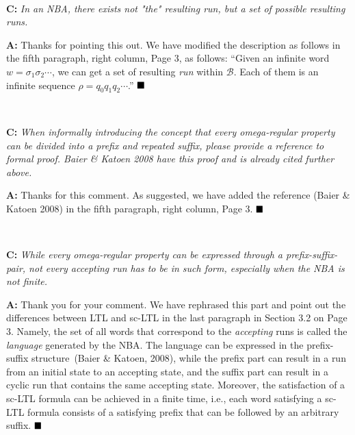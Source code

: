 \documentclass[10pt]{article}
\begin{document}
\hspace*{\fill} \


\textbf{C:}
\emph{In an NBA, there exists not "the" resulting run, but a set of possible resulting runs.
}

\textbf{A:} Thanks for pointing this out.
We have modified the description as follows in the fifth paragraph, right column, Page 3, as follows:
``Given an infinite word $w=\sigma_1\sigma_2\cdots$, we can get a set of
 resulting \emph{run} within $\mathcal{B}$.
Each of them is an infinite sequence $\rho=q_0q_1q_2\cdots$.''
$\hfill\blacksquare$

\hspace*{\fill} \


\textbf{C:}
\emph{ When informally introducing the concept that every omega-regular property can be divided
	into a prefix and repeated suffix, please provide a reference to formal proof. Baier \& Katoen
	2008 have this proof and is already cited further above.}

\textbf{A:} Thanks for this comment. As suggested, we have added the reference (Baier \& Katoen
2008) in the fifth paragraph, right column, Page 3.
$\hfill\blacksquare$

\hspace*{\fill} \


\textbf{C:}
\emph{While every omega-regular property can be expressed through a prefix-suffix-pair, not every
	accepting run has to be in such form, especially when the NBA is not finite.
}

\textbf{A:} Thank you for your comment. We have rephrased this part and point out
the differences between LTL and sc-LTL in the last paragraph in Section 3.2 on Page 3.
Namely, the set of all words that correspond to the \emph{accepting} runs is called
the \emph{language} generated by the NBA. The language can be expressed
in the prefix-suffix structure~(Baier \& Katoen, 2008), while the prefix part
can result in a run from an initial state to an accepting state, and the suffix
part can result in a cyclic run that contains the same accepting state.
Moreover, the
satisfaction of a sc-LTL formula can be achieved in a finite time, i.e.,
each word satisfying a sc-LTL formula consists of a satisfying prefix that
can be followed by an arbitrary suffix.
$\hfill\blacksquare$
\end{document}
